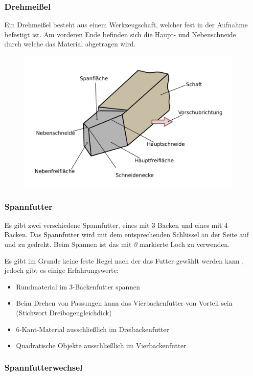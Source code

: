 \documentclass{\basedir/fablab-document}
\begin{document}
\newpage
\subsubsection{Drehmeißel}
Ein Drehmeißel besteht aus einem Werkzeugschaft, welcher fest in der Aufnahme befestigt ist. Am vorderen Ende befinden sich die Haupt- und Nebenschneide durch welche das Material
abgetragen wird.
\begin{figure}[ht]
\centering
\includegraphics[width = 0.75\linewidth]{img/drehmeissel}
\end{figure}

\subsubsection{Spannfutter}

Es gibt zwei verschiedene Spannfutter, eines mit 3 Backen und eines mit 4 Backen. Das Spannfutter wird mit dem entsprechenden Schlüssel an der Seite auf und zu gedreht. Beim Spannen ist das mit \emph{0} markierte Loch zu verwenden.

Es gibt im Grunde keine feste Regel nach der das Futter gewählt werden kann , jedoch gibt es einige Erfahrungswerte:
\begin{itemize} 
\item Rundmaterial im 3-Backenfutter spannen
\item Beim Drehen von Passungen kann das Vierbackenfutter von Vorteil sein (Stichwort Dreibogengleichdick)
\item 6-Kant-Material ausschließlich im Dreibackenfutter
\item Quadratische Objekte ausschließlich im Vierbackenfutter
\end{itemize}

\subsubsection{Spannfutterwechsel}
\end{document}
